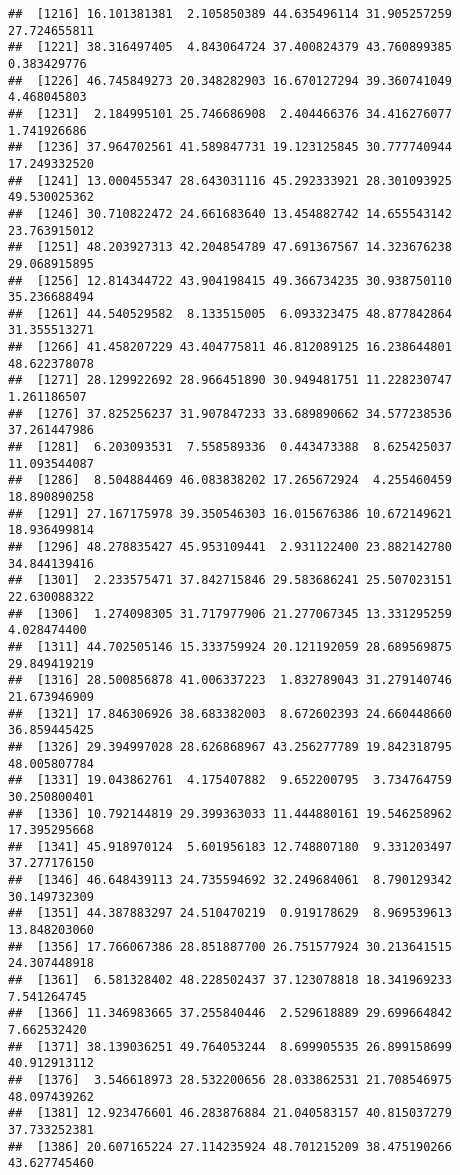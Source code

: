 \documentclass[
]{article}
\begin{document}
\begin{verbatim}
##  [1216] 16.101381381  2.105850389 44.635496114 31.905257259 27.724655811
##  [1221] 38.316497405  4.843064724 37.400824379 43.760899385  0.383429776
##  [1226] 46.745849273 20.348282903 16.670127294 39.360741049  4.468045803
##  [1231]  2.184995101 25.746686908  2.404466376 34.416276077  1.741926686
##  [1236] 37.964702561 41.589847731 19.123125845 30.777740944 17.249332520
##  [1241] 13.000455347 28.643031116 45.292333921 28.301093925 49.530025362
##  [1246] 30.710822472 24.661683640 13.454882742 14.655543142 23.763915012
##  [1251] 48.203927313 42.204854789 47.691367567 14.323676238 29.068915895
##  [1256] 12.814344722 43.904198415 49.366734235 30.938750110 35.236688494
##  [1261] 44.540529582  8.133515005  6.093323475 48.877842864 31.355513271
##  [1266] 41.458207229 43.404775811 46.812089125 16.238644801 48.622378078
##  [1271] 28.129922692 28.966451890 30.949481751 11.228230747  1.261186507
##  [1276] 37.825256237 31.907847233 33.689890662 34.577238536 37.261447986
##  [1281]  6.203093531  7.558589336  0.443473388  8.625425037 11.093544087
##  [1286]  8.504884469 46.083838202 17.265672924  4.255460459 18.890890258
##  [1291] 27.167175978 39.350546303 16.015676386 10.672149621 18.936499814
##  [1296] 48.278835427 45.953109441  2.931122400 23.882142780 34.844139416
##  [1301]  2.233575471 37.842715846 29.583686241 25.507023151 22.630088322
##  [1306]  1.274098305 31.717977906 21.277067345 13.331295259  4.028474400
##  [1311] 44.702505146 15.333759924 20.121192059 28.689569875 29.849419219
##  [1316] 28.500856878 41.006337223  1.832789043 31.279140746 21.673946909
##  [1321] 17.846306926 38.683382003  8.672602393 24.660448660 36.859445425
##  [1326] 29.394997028 28.626868967 43.256277789 19.842318795 48.005807784
##  [1331] 19.043862761  4.175407882  9.652200795  3.734764759 30.250800401
##  [1336] 10.792144819 29.399363033 11.444880161 19.546258962 17.395295668
##  [1341] 45.918970124  5.601956183 12.748807180  9.331203497 37.277176150
##  [1346] 46.648439113 24.735594692 32.249684061  8.790129342 30.149732309
##  [1351] 44.387883297 24.510470219  0.919178629  8.969539613 13.848203060
##  [1356] 17.766067386 28.851887700 26.751577924 30.213641515 24.307448918
##  [1361]  6.581328402 48.228502437 37.123078818 18.341969233  7.541264745
##  [1366] 11.346983665 37.255840446  2.529618889 29.699664842  7.662532420
##  [1371] 38.139036251 49.764053244  8.699905535 26.899158699 40.912913112
##  [1376]  3.546618973 28.532200656 28.033862531 21.708546975 48.097439262
##  [1381] 12.923476601 46.283876884 21.040583157 40.815037279 37.733252381
##  [1386] 20.607165224 27.114235924 48.701215209 38.475190266 43.627745460

\end{verbatim}
\end{document}
